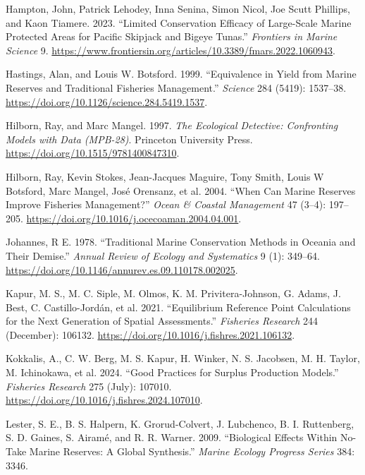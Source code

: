 \documentclass[
  default,
  lineno,
  referee]{sn-jnl}
\newlength{\cslhangindent}
\newenvironment{CSLReferences}[2] %
 {\begin{list}{}{%
  \setlength{\itemindent}{0pt}
  \setlength{\leftmargin}{0pt}
  \setlength{\parsep}{0pt}
  \ifodd #1
   \setlength{\leftmargin}{\cslhangindent}
   \setlength{\itemindent}{-1\cslhangindent}
  \fi
  \setlength{\itemsep}{#2\baselineskip}}}
 {\end{list}}
\begin{document}
\begin{CSLReferences}{1}{0}
Hampton, John, Patrick Lehodey, Inna Senina, Simon Nicol, Joe Scutt
Phillips, and Kaon Tiamere. 2023. {``Limited Conservation Efficacy of
Large-Scale Marine Protected Areas for Pacific Skipjack and Bigeye
Tunas.''} \emph{Frontiers in Marine Science} 9.
\url{https://www.frontiersin.org/articles/10.3389/fmars.2022.1060943}.

Hastings, Alan, and Louis W. Botsford. 1999. {``Equivalence in Yield
from Marine Reserves and Traditional Fisheries Management.''}
\emph{Science} 284 (5419): 1537--38.
\url{https://doi.org/10.1126/science.284.5419.1537}.

Hilborn, Ray, and Marc Mangel. 1997. \emph{The Ecological Detective:
Confronting Models with Data (MPB-28)}. Princeton University Press.
\url{https://doi.org/10.1515/9781400847310}.

Hilborn, Ray, Kevin Stokes, Jean-Jacques Maguire, Tony Smith, Louis W
Botsford, Marc Mangel, José Orensanz, et al. 2004. {``When Can Marine
Reserves Improve Fisheries Management?''} \emph{Ocean \& Coastal
Management} 47 (3--4): 197--205.
\url{https://doi.org/10.1016/j.ocecoaman.2004.04.001}.

Johannes, R E. 1978. {``Traditional Marine Conservation Methods in
Oceania and Their Demise.''} \emph{Annual Review of Ecology and
Systematics} 9 (1): 349--64.
\url{https://doi.org/10.1146/annurev.es.09.110178.002025}.

Kapur, M. S., M. C. Siple, M. Olmos, K. M. Privitera-Johnson, G. Adams,
J. Best, C. Castillo-Jordán, et al. 2021. {``Equilibrium Reference Point
Calculations for the Next Generation of Spatial Assessments.''}
\emph{Fisheries Research} 244 (December): 106132.
\url{https://doi.org/10.1016/j.fishres.2021.106132}.

Kokkalis, A., C. W. Berg, M. S. Kapur, H. Winker, N. S. Jacobsen, M. H.
Taylor, M. Ichinokawa, et al. 2024. {``Good Practices for Surplus
Production Models.''} \emph{Fisheries Research} 275 (July): 107010.
\url{https://doi.org/10.1016/j.fishres.2024.107010}.

Lester, S. E., B. S. Halpern, K. Grorud-Colvert, J. Lubchenco, B. I.
Ruttenberg, S. D. Gaines, S. Airamé, and R. R. Warner. 2009.
{``Biological Effects Within No-Take Marine Reserves: A Global
Synthesis.''} \emph{Marine Ecology Progress Series} 384: 3346.


\end{CSLReferences}
\end{document}
